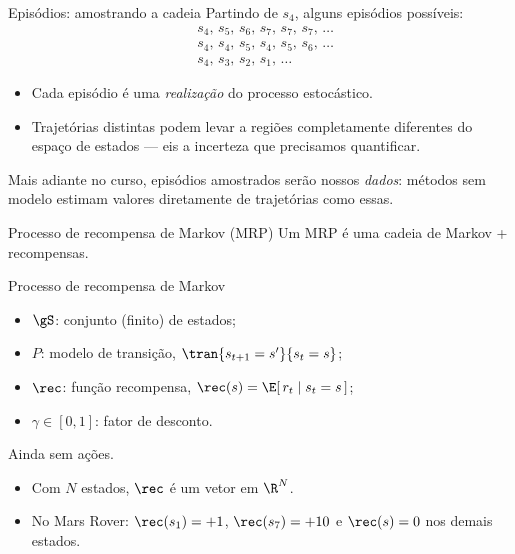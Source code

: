 \documentclass[aspectratio=169, 11pt]{beamer}
\begin{document}
\begin{frame}{Episódios: amostrando a cadeia}
  Partindo de $s_4$, alguns episódios possíveis:
  \begin{align*}
    &s_4,\, s_5,\, s_6,\, s_7,\, s_7,\, s_7,\, \ldots \\
    &s_4,\, s_4,\, s_5,\, s_4,\, s_5,\, s_6,\, \ldots \\
    &s_4,\, s_3,\, s_2,\, s_1,\, \ldots
  \end{align*}

  \begin{itemize}
    \item Cada episódio é uma \emph{realização} do processo estocástico.
    \item Trajetórias distintas podem levar a regiões completamente
          diferentes do espaço de estados — eis a incerteza que precisamos
          quantificar.
  \end{itemize}

  \begin{ideiabox}
    Mais adiante no curso, episódios amostrados serão nossos \emph{dados}:
    métodos sem modelo estimam valores diretamente de trajetórias como
    essas.
  \end{ideiabox}
\end{frame}

\begin{frame}{Processo de recompensa de Markov (MRP)}
  Um MRP é uma cadeia de Markov \alert{+ recompensas}.

  \begin{defbox}{Processo de recompensa de Markov}
    \begin{itemize}
      \item $\gS$: conjunto (finito) de estados;
      \item $P$: modelo de transição, $\tran{s_{t+1}=s'}{s_t=s}$;
      \item $\rec$: função recompensa,
            $\rec(s) = \E[\, r_t \mid s_t = s \,]$;
      \item $\gamma \in [0,1]$: fator de desconto.
    \end{itemize}
    Ainda sem ações.
  \end{defbox}

  \begin{itemize}
    \item Com $N$ estados, $\rec$ é um vetor em $\R^N$.
    \item No Mars Rover: $\rec(s_1) = +1$, $\rec(s_7) = +10$ e
          $\rec(s) = 0$ nos demais estados.
  \end{itemize}
\end{frame}
\end{document}
